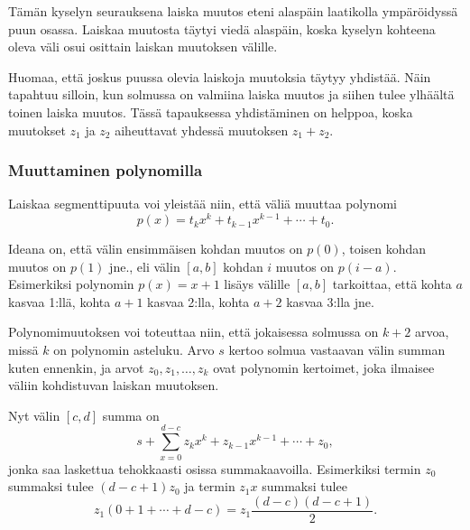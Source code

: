 \begin{center}
\end{center}
Tämän kyselyn seurauksena laiska muutos eteni alaspäin
laatikolla ympäröidyssä puun osassa.
Laiskaa muutosta täytyi viedä alaspäin, koska kyselyn
kohteena oleva väli osui osittain laiskan muutoksen välille.

Huomaa, että joskus puussa olevia laiskoja muutoksia täytyy yhdistää.
Näin tapahtuu silloin, kun solmussa on valmiina laiska muutos
ja siihen tulee ylhäältä toinen laiska muutos.
Tässä tapauksessa yhdistäminen on helppoa,
koska muutokset $z_1$ ja $z_2$ aiheuttavat yhdessä muutoksen $z_1+z_2$.

\subsubsection{Muuttaminen polynomilla}

Laiskaa segmenttipuuta voi yleistää niin,
että väliä muuttaa polynomi
\[p(x) = t_k x^k + t_{k-1} x^{k-1} + \cdots + t_0.\]

Ideana on, että välin ensimmäisen kohdan
muutos on $p(0)$, toisen kohdan muutos on $p(1)$ jne.,
eli välin $[a,b]$ kohdan $i$ muutos on $p(i-a)$.
Esimerkiksi polynomin $p(x)=x+1$ lisäys välille
$[a,b]$ tarkoittaa, että kohta $a$ kasvaa 1:llä,
kohta $a+1$ kasvaa 2:lla, kohta $a+2$ kasvaa 3:lla jne.

Polynomimuutoksen voi toteuttaa niin,
että jokaisessa solmussa on $k+2$ arvoa,
missä $k$ on polynomin asteluku.
Arvo $s$ kertoo solmua vastaavan välin summan kuten ennenkin,
ja arvot $z_0,z_1,\ldots,z_k$ ovat polynomin kertoimet,
joka ilmaisee väliin kohdistuvan laiskan muutoksen.

Nyt välin $[c,d]$ summa on
\[s+\sum_{x=0}^{d-c} z_k x^k + z_{k-1} x^{k-1} + \cdots + z_0,\]
jonka saa laskettua tehokkaasti osissa summakaavoilla.
Esimerkiksi termin $z_0$ summaksi tulee
$(d-c+1)z_0$ ja termin $z_1 x$ summaksi tulee
\[z_1(0+1+\cdots+d-c) = z_1 \frac{(d-c)(d-c+1)}{2} .\]

